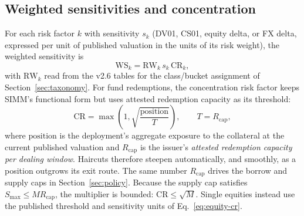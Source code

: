 \subsection{Weighted sensitivities and concentration}\label{sec:agg-ws}
For each risk factor $k$ with sensitivity $s_k$ (DV01, CS01, equity delta, or FX delta, expressed per unit of published valuation in the units of its risk weight), the weighted sensitivity is
\begin{equation}\label{eq:agg-ws}
\mathrm{WS}_k=\mathrm{RW}_k\, s_k\, \mathrm{CR}_k ,
\end{equation}
with $\mathrm{RW}_k$ read from the v2.6 tables for the class/bucket assignment of
Section~\ref{sec:taxonomy}. For fund redemptions, the concentration risk factor keeps SIMM's functional form
but uses attested redemption capacity as its threshold:
\begin{equation}\label{eq:agg-cr}
\mathrm{CR}=\max\!\left(1,\sqrt{\frac{\mathrm{position}}{T}}\right),\qquad
T=R_{\mathrm{cap}},
\end{equation}
where $\mathrm{position}$ is the deployment's aggregate exposure to the collateral at the current
published valuation and $R_{\mathrm{cap}}$ is the issuer's \emph{attested redemption capacity per dealing window}.
Haircuts therefore steepen automatically, and smoothly, as a position outgrows its exit
route. The same number $R_{\mathrm{cap}}$ drives the borrow and supply caps in
Section~\ref{sec:policy}. Because the supply cap satisfies
$S_{\max}\le M R_{\mathrm{cap}}$, the multiplier is bounded:
$\mathrm{CR}\le\sqrt{M}$. Single equities instead use the published threshold and sensitivity units of Eq.~\eqref{eq:equity-cr}.

